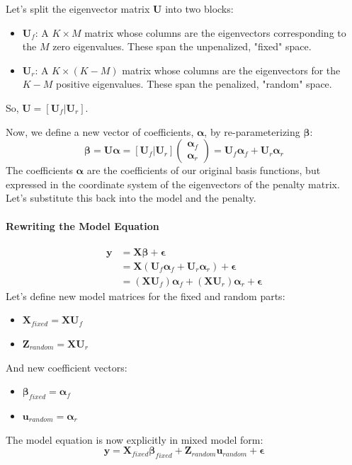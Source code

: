 \documentclass[11pt, a4paper]{article}
\begin{document}
Let's split the eigenvector matrix $\mathbf{U}$ into two blocks:
\begin{itemize}
    \item $\mathbf{U}_f$: A $K \times M$ matrix whose columns are the eigenvectors corresponding to the $M$ zero eigenvalues. These span the unpenalized, "fixed" space.
    \item $\mathbf{U}_r$: A $K \times (K-M)$ matrix whose columns are the eigenvectors for the $K-M$ positive eigenvalues. These span the penalized, "random" space.
\end{itemize}
So, $\mathbf{U} = [\mathbf{U}_f | \mathbf{U}_r]$.

Now, we define a new vector of coefficients, $\boldsymbol{\alpha}$, by re-parameterizing $\boldsymbol{\beta}$:
\begin{equation*}
    \boldsymbol{\beta} = \mathbf{U}\boldsymbol{\alpha} = [\mathbf{U}_f | \mathbf{U}_r] \begin{pmatrix} \boldsymbol{\alpha}_f \\ \boldsymbol{\alpha}_r \end{pmatrix} = \mathbf{U}_f\boldsymbol{\alpha}_f + \mathbf{U}_r\boldsymbol{\alpha}_r
\end{equation*}
The coefficients $\boldsymbol{\alpha}$ are the coefficients of our original basis functions, but expressed in the coordinate system of the eigenvectors of the penalty matrix. Let's substitute this back into the model and the penalty.

\paragraph{Rewriting the Model Equation}
\begin{align*}
    \mathbf{y} &= \mathbf{X}\boldsymbol{\beta} + \boldsymbol{\epsilon} \\
    &= \mathbf{X}(\mathbf{U}_f\boldsymbol{\alpha}_f + \mathbf{U}_r\boldsymbol{\alpha}_r) + \boldsymbol{\epsilon} \\
    &= (\mathbf{X}\mathbf{U}_f)\boldsymbol{\alpha}_f + (\mathbf{X}\mathbf{U}_r)\boldsymbol{\alpha}_r + \boldsymbol{\epsilon}
\end{align*}
Let's define new model matrices for the fixed and random parts:
\begin{itemize}
    \item $\mathbf{X}_{fixed} = \mathbf{X}\mathbf{U}_f$
    \item $\mathbf{Z}_{random} = \mathbf{X}\mathbf{U}_r$
\end{itemize}
And new coefficient vectors:
\begin{itemize}
    \item $\boldsymbol{\beta}_{fixed} = \boldsymbol{\alpha}_f$
    \item $\mathbf{u}_{random} = \boldsymbol{\alpha}_r$
\end{itemize}
The model equation is now explicitly in mixed model form:
\begin{equation*}
    \mathbf{y} = \mathbf{X}_{fixed}\boldsymbol{\beta}_{fixed} + \mathbf{Z}_{random}\mathbf{u}_{random} + \boldsymbol{\epsilon}
\end{equation*}
\end{document}
